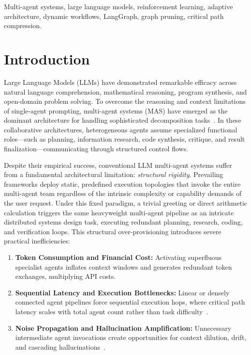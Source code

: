 \documentclass[conference]{IEEEtran}
\begin{document}
\begin{IEEEkeywords}
Multi-agent systems, large language models, reinforcement learning, adaptive architecture, dynamic workflows, LangGraph, graph pruning, critical path compression.
\end{IEEEkeywords}

\section{Introduction}
\label{sec:introduction}

Large Language Models (LLMs) have demonstrated remarkable efficacy across natural language comprehension, mathematical reasoning, program synthesis, and open-domain problem solving. To overcome the reasoning and context limitations of single-agent prompting, multi-agent systems (MAS) have emerged as the dominant architecture for handling sophisticated decomposition tasks~\cite{hong2024metagpt,lee2026survey,cao2025survey}. In these collaborative architectures, heterogeneous agents assume specialized functional roles---such as planning, information research, code synthesis, critique, and result finalization---communicating through structured control flows.

Despite their empirical success, conventional LLM multi-agent systems suffer from a fundamental architectural limitation: \emph{structural rigidity}. Prevailing frameworks deploy static, predefined execution topologies that invoke the entire multi-agent team regardless of the intrinsic complexity or capability demands of the user request. Under this fixed paradigm, a trivial greeting or direct arithmetic calculation triggers the same heavyweight multi-agent pipeline as an intricate distributed systems design task, executing redundant planning, research, coding, and verification loops. This structural over-provisioning introduces severe practical inefficiencies:
\begin{enumerate}[leftmargin=*]
    \item \textbf{Token Consumption and Financial Cost:} Activating superfluous specialist agents inflates context windows and generates redundant token exchanges, multiplying API costs.
    \item \textbf{Sequential Latency and Execution Bottlenecks:} Linear or densely connected agent pipelines force sequential execution hops, where critical path latency scales with total agent count rather than task difficulty~\cite{Li2025AdaptiveGraphPruning}.
    \item \textbf{Noise Propagation and Hallucination Amplification:} Unnecessary intermediate agent invocations create opportunities for context dilution, drift, and cascading hallucinations~\cite{xiao2026agentdropout}.
\end{enumerate}
\end{document}
